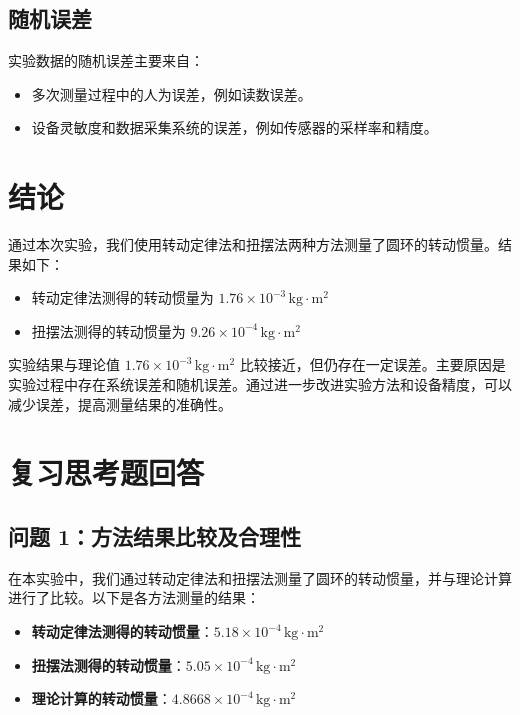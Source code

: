 \documentclass[UTF8]{ctexart}
\begin{document}
    \subsection{随机误差}
    实验数据的随机误差主要来自：
    \begin{itemize}
        \item 多次测量过程中的人为误差，例如读数误差。
        \item 设备灵敏度和数据采集系统的误差，例如传感器的采样率和精度。
    \end{itemize}
    

    
    \section{结论}
    通过本次实验，我们使用转动定律法和扭摆法两种方法测量了圆环的转动惯量。结果如下：
    \begin{itemize}
        \item 转动定律法测得的转动惯量为 \(1.76 \times 10^{-3} \, \text{kg} \cdot \text{m}^2\)
        \item 扭摆法测得的转动惯量为 \(9.26 \times 10^{-4} \, \text{kg} \cdot \text{m}^2\)
    \end{itemize}
    
    实验结果与理论值 \(1.76 \times 10^{-3} \, \text{kg} \cdot \text{m}^2\) 比较接近，但仍存在一定误差。主要原因是实验过程中存在系统误差和随机误差。通过进一步改进实验方法和设备精度，可以减少误差，提高测量结果的准确性。

    \section{复习思考题回答}

\subsection{问题 1：方法结果比较及合理性}

在本实验中，我们通过转动定律法和扭摆法测量了圆环的转动惯量，并与理论计算进行了比较。以下是各方法测量的结果：

\begin{itemize}
    \item \textbf{转动定律法测得的转动惯量}：$5.18 \times 10^{-4} \, \text{kg} \cdot \text{m}^2$
    \item \textbf{扭摆法测得的转动惯量}：$5.05 \times 10^{-4} \, \text{kg} \cdot \text{m}^2$
    \item \textbf{理论计算的转动惯量}：$4.8668 \times 10^{-4} \, \text{kg} \cdot \text{m}^2$
\end{itemize}
\end{document}
